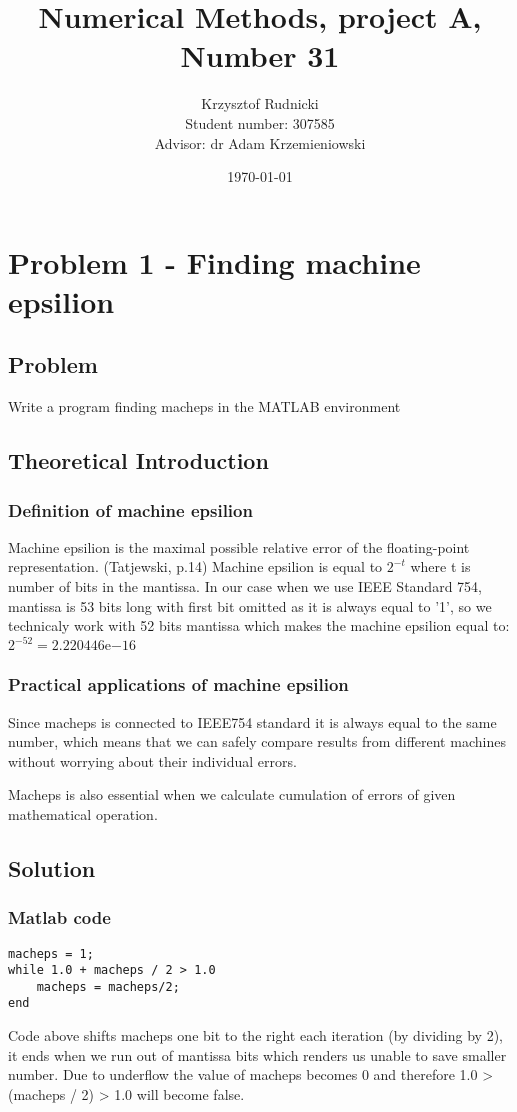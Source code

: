 \documentclass{report}
\title{Numerical Methods, project A, Number 31}
\author{Krzysztof Rudnicki\\ Student number: 307585 \\ Advisor: dr Adam Krzemieniowski}
\date{\today}
\begin{document}
\maketitle
\tableofcontents

\chapter{Problem 1 - Finding machine epsilion}

\section{Problem}
Write a program finding macheps in the MATLAB environment
\section{Theoretical Introduction}
\subsection{Definition of machine epsilion}
Machine epsilion is the maximal possible relative error of the floating-point representation. (Tatjewski, p.14)
Machine epsilion is equal to $2^{-t}$ where t is number of bits in the mantissa.
In our case when we use IEEE Standard 754, mantissa is 53 bits long with first bit omitted as it is always equal to '1', so we technicaly work with 52 bits mantissa which makes the machine epsilion equal to: $2^{-52} = 2.220446\mathrm{e}{-16}$

\subsection{Practical applications of machine epsilion}
Since macheps is connected to IEEE754 standard it is always equal to the same number, which means that we can safely compare results from different machines without worrying about their individual errors.

Macheps is also essential when we calculate cumulation of errors of given mathematical operation.

\newpage
\section{Solution}

\subsection{Matlab code}
\begin{lstlisting}
macheps = 1;
while 1.0 + macheps / 2 > 1.0
    macheps = macheps/2;
end
\end{lstlisting}
Code above shifts macheps one bit to the right each iteration (by dividing by 2), it ends when we run out of mantissa bits which renders us unable to save smaller number. Due to underflow the value of macheps becomes 0 and therefore 1.0 > (macheps / 2) > 1.0 will become false.
\end{document}
